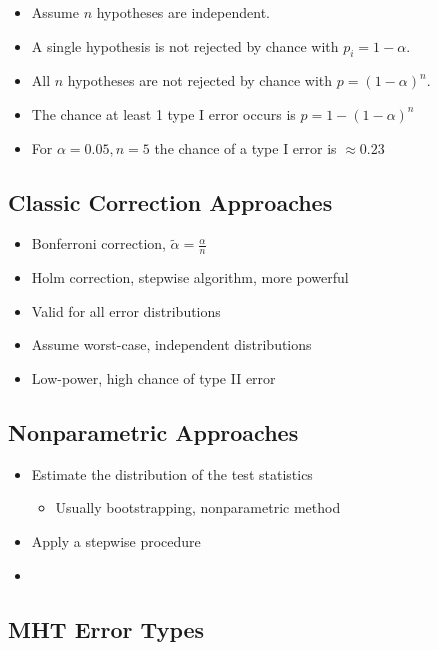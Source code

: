 \documentclass[10pt]{article}
\begin{document}
	\begin{itemize}
		\item Assume $n$ hypotheses are independent.
		\item A single hypothesis is not rejected by chance with $p_i = 1-\alpha$.
		\item All $n$ hypotheses are not rejected by chance with $p = (1-\alpha)^n$.
		\item The chance at least 1 type I error occurs is $p = 1 - (1-\alpha)^n$
		\item For $\alpha=0.05, n=5$ the chance of a type I error is $\approx 0.23$
	\end{itemize}

	\subsection[Classic Correction Approaches]{Classic Correction Approaches}

	\begin{itemize}
		\item Bonferroni correction, $\tilde{\alpha} = \frac{\alpha}{n}$
		\item Holm correction, stepwise algorithm, more powerful
		\item Valid for all error distributions
		\item Assume worst-case, independent distributions
		\item Low-power, high chance of type II error
	\end{itemize}

	\subsection[Nonparametric Approaches]{Nonparametric Approaches}

	\begin{itemize}
		\item Estimate the distribution of the test statistics
			\begin{itemize}
				\item Usually bootstrapping, nonparametric method 
			\end{itemize}
		\item Apply a stepwise procedure 
		\item \textcite{list_2019,white_2000,romano_2005}
	\end{itemize}

	\subsection[MHT Error Types]{MHT Error Types}
\end{document}
